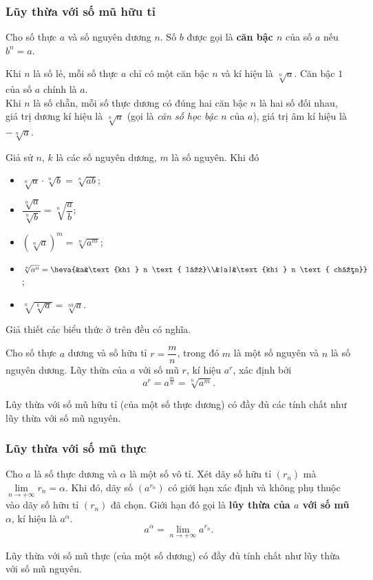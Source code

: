 \begin{tomtat}
\subsubsection{Lũy thừa với số mũ hữu tỉ}
\begin{dn}
	Cho số thực $a$ và số nguyên dương $n$. Số $b$ được gọi là \textbf{căn bậc $n$} của số $a$ nếu $b^n=a$.
\end{dn}
\begin{nx}
	Khi $n$ là số lẻ, mỗi số thực $a$ chỉ có một căn bậc $n$ và kí hiệu là $\sqrt[n]{a}$. Căn bậc $1$ của số $a$ chính là $a$.\\
	Khi $n$ là số chẵn, mỗi số thực dương có đúng hai căn bậc $n$ là hai số đối nhau, giá trị dương kí hiệu là $\sqrt[n]{a}$ (gọi là \textit{căn số học bậc $n$} của $a$), giá trị âm kí hiệu là $-\sqrt[n]{a}$. 
\end{nx}
\begin{tc}
	Giả sử $n$, $k$ là các số nguyên dương, $m$ là số nguyên. Khi đó
	\begin{multicols}{2}
		\begin{itemize}
			\item $\sqrt[n]{a}\cdot\sqrt[n]{b}=\sqrt[n]{ab}$;
			\item $\dfrac{\sqrt[n]{a}}{\sqrt[n]{b}}=\sqrt[n]{\dfrac{a}{b}}$;
			\item $\left(\sqrt[n]{a}\right)^m=\sqrt[n]{a^m}$;
			\item $\sqrt[n]{a^n}=\heva{&a&\text{khi } n \text{ lẻ}\\&|a|&\text{khi } n \text{ chẵn}}$;
			\item $\sqrt[n]{\sqrt[k]{a}}=\sqrt[nk]{a}$.
		\end{itemize}
	\end{multicols}
	Giả thiết các biểu thức ở trên đều có nghĩa.
\end{tc}
\begin{dn}
	Cho số thực $a$ dương và số hữu tỉ $r=\dfrac{m}{n}$, trong đó $m$ là một số nguyên và $n$ là số nguyên dương. Lũy thừa của $a$ với số mũ $r$, kí hiệu $a^r$, xác định bởi $$a^r=a^{\tfrac{m}{n}}=\sqrt[n]{a^m}.$$
\end{dn}
\begin{note}
	Lũy thừa với số mũ hữu tỉ (của một số thực dương) có đầy đủ các tính chất như lũy thừa với số mũ nguyên.
\end{note}
\subsubsection{Lũy thừa với số mũ thực}
\begin{dn}
	Cho $a$ là số thực dương và $\alpha$ là một số vô tỉ. Xét dãy số hữu tỉ $(r_n)$ mà $\lim\limits_{n\to +\infty}r_n=\alpha$. Khi đó, dãy số $\left(a^{r_n}\right)$ có giới hạn xác định và không phụ thuộc vào dãy số hữu tỉ $(r_n)$ đã chọn. Giới hạn đó gọi là \textbf{lũy thừa của $a$ với số mũ $\alpha$}, kí hiệu là $a^{\alpha}$.
	$$a^{\alpha}=\lim\limits_{n\to +\infty}a^{r_n}.$$
\end{dn}
\begin{note}
	Lũy thừa với số mũ thực (của một số dương) có đầy đủ tính chất như lũy thừa với số mũ nguyên.
\end{note}

\end{tomtat}
